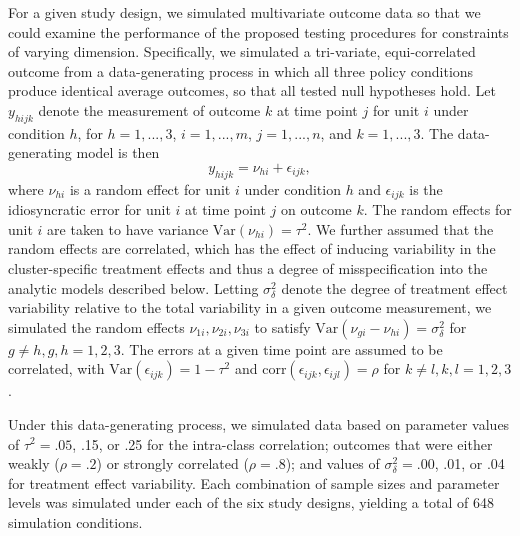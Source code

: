 \documentclass[12pt]{article}\usepackage[]{graphicx}\usepackage[]{color}
\newcommand{\Var}{\text{Var}}
\begin{document}
For a given study design, we simulated multivariate outcome data so that we could examine the performance of the proposed testing procedures for constraints of varying dimension. 
Specifically, we simulated a tri-variate, equi-correlated outcome from a data-generating process in which all three policy conditions produce identical average outcomes, so that all tested null hypotheses hold. 
Let $y_{hijk}$ denote the measurement of outcome $k$ at time point $j$ for unit $i$ under condition $h$, for $h = 1,...,3$, $i = 1,...,m$, $j = 1,...,n$, and $k = 1,...,3$. 
The data-generating model is then 
\begin{equation}
\label{eq:data_generating_model}
y_{hijk} = \nu_{hi} + \epsilon_{ijk},
\end{equation}
where $\nu_{hi}$ is a random effect for unit $i$ under condition $h$ and $\epsilon_{ijk}$ is the idiosyncratic error for unit $i$ at time point $j$ on outcome $k$. 
The random effects for unit $i$ are taken to have variance $\Var\left(\nu_{hi}\right) = \tau^2$. 
We further assumed that the random effects are correlated, which has the effect of inducing variability in the cluster-specific treatment effects and thus a degree of misspecification into the analytic models described below. Letting $\sigma_\delta^2$ denote the degree of treatment effect variability relative to the total variability in a given outcome measurement, we simulated the random effects $\nu_{1i},\nu_{2i},\nu_{3i}$ to satisfy $\text{Var}\left(\nu_{gi} - \nu_{hi}\right) = \sigma_\delta^2$ for $g \neq h, g,h = 1,2,3$. 
The errors at a given time point are assumed to be correlated, with $\Var\left(\epsilon_{ijk}\right) = 1 - \tau^2$ and $\text{corr}\left(\epsilon_{ijk}, \epsilon_{ijl}\right) = \rho$ for $k\neq l, k,l = 1,2,3$. 

Under this data-generating process, we simulated data based on parameter values of $\tau^2 = .05$, .15, or .25 for the intra-class correlation; outcomes that were either weakly ($\rho = .2$) or strongly correlated ($\rho = .8$); and values of $\sigma_\delta^2 = .00$, .01, or .04 for treatment effect variability.
Each combination of sample sizes and parameter levels was simulated under each of the six study designs, yielding a total of 648 simulation conditions.
\end{document}
